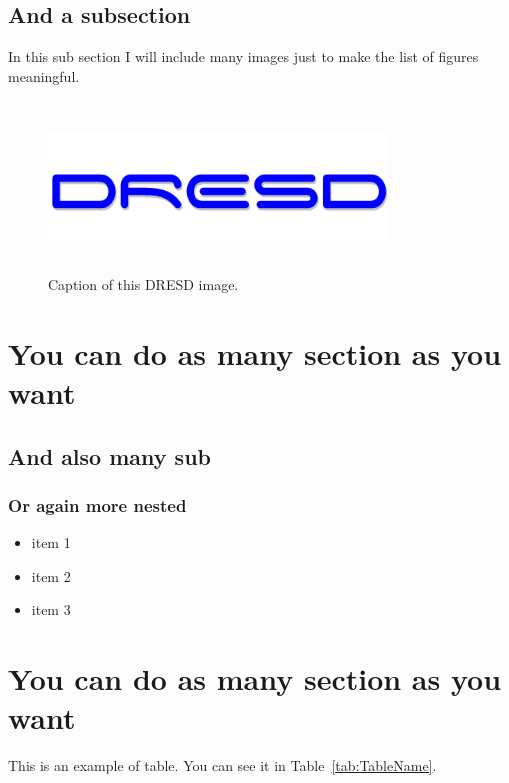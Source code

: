 \documentclass[a4paper,12pt]{article}
\begin{document}
	\subsection{And a subsection}
		In this sub section I will include many images just to make the list of figures meaningful.

			\begin{figure}[h!tb]
				\centerline {\includegraphics[width=9cm,height=4.5cm]{img/scritta.png}}
				\caption{Caption of this DRESD image.}
				\label{fig:leet}
			\end{figure}

\newpage

\section{You can do as many section as you want}
	\subsection{And also many sub}
		\subsubsection{Or again more nested}
			\begin{itemize}
				\item item 1
				\item item 2
				\item item 3
			\end{itemize}			

\newpage
			
\section{You can do as many section as you want}
This is an example of table. You can see it in Table~\ref{tab:TableName}. 
\end{document}
